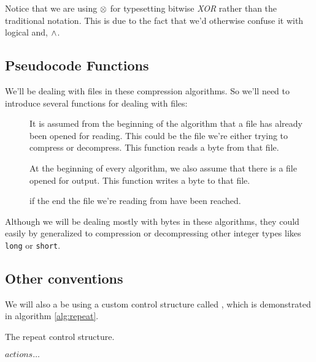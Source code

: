 \begin{refsection}
Notice that we are using $\mathrel{\otimes}$ for typesetting bitwise
\textit{XOR} rather than the traditional \C{} notation. This is due to
the fact that we'd otherwise confuse it with logical and, $\wedge$.

\subsection{Pseudocode Functions}
\label{sec:pseudocode}

We'll be dealing with files in these compression algorithms. So we'll
need to introduce several functions for dealing with files:

\begin{description}
\item[] It is assumed from the beginning of the
  algorithm that a file has already been opened for reading. This
  could be the file we're either trying to compress or
  decompress. This function reads a byte from that file.

\item[] At the beginning of every algorithm, we also
  assume that there is a file opened for output. This function writes
  a byte to that file.

\item[] \True{} if the end the file we're
  reading from have been reached.

\end{description}

Although we will be dealing mostly with bytes in these algorithms, they could
easily by generalized to compression or decompressing other integer
types likes \texttt{long} or \texttt{short}.

\subsection{Other conventions}
\label{sec:other-conventions}

We will also a be using a custom control structure called \algorithmicrepeat,
which is demonstrated in algorithm \ref{alg:repeat}.

\begin{algorithm}[h]
  \caption{The repeat control structure.}
  \label{alg:repeat}
  \begin{algorithmic}[1]
      \State $actions\ldots$  %
    \EndRepeat
  \end{algorithmic}
\end{algorithm}


\end{refsection}
